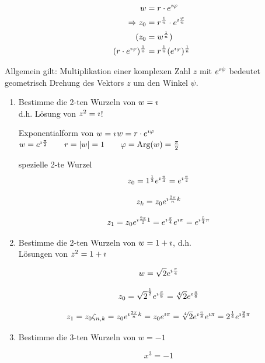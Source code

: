 \begin{align*}
w &= r\cdot e^{\imath \varphi}\\
\Rightarrow z_0&=r^{\frac{1}{n}}\cdot e^{\imath \frac{\varphi}{n}}\\
(z_0 &= w^{\frac{1}{n}})\\
(r\cdot e^{\imath\varphi})^\frac{1}{n}&=r^\frac{1}{n}(e^{\imath\varphi})^\frac{1}{n}
\end{align*}

Allgemein gilt: Multiplikation einer komplexen Zahl $z$ mit $e^{\imath \psi}$ bedeutet geometrisch {\flqq Drehung des Vektors $z$ um den Winkel $\psi$\frqq}.


\begin{enumerate}
	\item Bestimme die 2-ten Wurzeln von $w=\imath$\\
	d.h. Lösung von $z^2=\imath$!
	
	Exponentialform von $w=\imath$\qquad$w=r\cdot e^{\imath\varphi}$\\
	$w=e^{\imath\frac{\pi}{2}}\qquad r=|w|=1\qquad\varphi=\mathbin\text{Arg}(w)=\frac{\pi}{2}$
	
	
	spezielle 2-te Wurzel\\
	$$z_0=1^{\frac{1}{2}}e^{\imath\frac{\pi}{4}}=e^{\imath\frac{\pi}{4}}$$
	
	$$z_k=z_0e^{\imath\frac{2\pi}{n}k}$$
	
	$$z_1=z_0e^{\imath\frac{2\pi}{2}1}\\
	=e^{\imath\frac{\pi}{4}}e^{\imath\pi}\\
	=e^{\imath\frac{5}{4}\pi}$$
	
	
	\item Bestimme die 2-ten Wurzeln von $w=1+\imath$, d.h.\\
	Lösungen von $z^2=1+\imath$
	
	$$w=\sqrt{2}e^{\imath\frac{\pi}{4}}$$
	
	$$z_0=\sqrt{2}^{\frac{1}{2}}e^{\imath\frac{\pi}{8}}=\sqrt[4]{2}e^{\imath\frac{\pi}{8}}$$
	
	$$z_1=z_0\zeta_{n,k}=z_0e^{\imath\frac{2\pi}{n}k}=z_0e^{\imath\pi}=\sqrt[4]{2}e^{\imath\frac{\pi}{8}}e^{\imath\pi}=2^{\frac{1}{4}}e^{\imath\frac{9}{8}\pi}$$
	
	
	\item Bestimme die 3-ten Wurzeln von $w=-1$
	
	$$x^3= -1$$
	

\end{enumerate}
